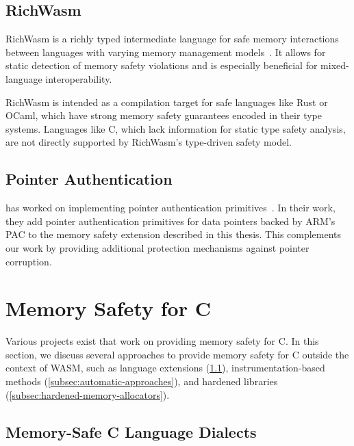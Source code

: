 \subsection{RichWasm}
\label{subsec:richwasm}

RichWasm is a richly typed intermediate language for safe memory interactions between languages with varying memory management models~\cite{paraskevopoulou2024richwasm}.
It allows for static detection of memory safety violations and is especially beneficial for mixed-language interoperability.

RichWasm is intended as a compilation target for safe languages like Rust or OCaml, which have strong memory safety guarantees encoded in their type systems.
Languages like C, which lack information for static type safety analysis, are not directly supported by RichWasm's type-driven safety model.

\subsection{Pointer Authentication}
\label{subsec:related-pointer-authentication}

\citeauthor*{rehde2023wasm} has worked on implementing pointer authentication primitives~\cite{rehde2023wasm}.
In their work, they add pointer authentication primitives for data pointers backed by ARM's \ac{PAC} to the memory safety extension described in this thesis.
This complements our work by providing additional protection mechanisms against pointer corruption.


\section{Memory Safety for C}
\label{sec:related-memory-safety}

Various projects exist that work on providing memory safety for C.
In this section, we discuss several approaches to provide memory safety for C outside the context of \ac{WASM}, such as language extensions (\cref{subsec:extensions-to-the-c-language}), instrumentation-based methods (\cref{subsec:automatic-approaches}), and hardened libraries (\cref{subsec:hardened-memory-allocators}).

\subsection{Memory-Safe C Language Dialects}
\label{subsec:extensions-to-the-c-language}

